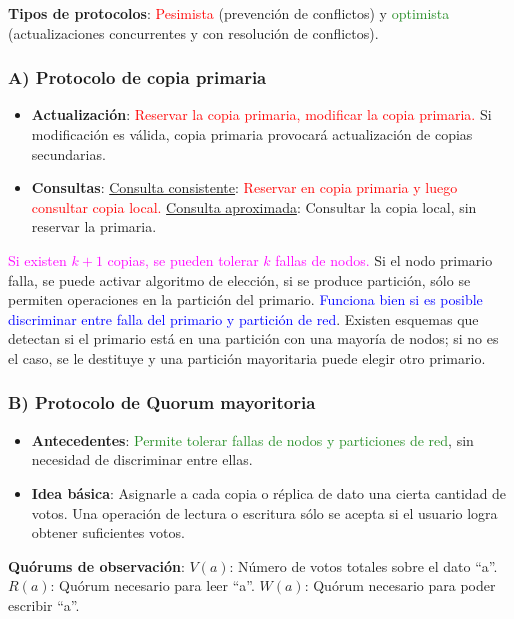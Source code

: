 \textbf{Tipos de protocolos}: \textcolor{red}{Pesimista} 
(prevención de conflictos) y \textcolor{ForestGreen}{optimista} (actualizaciones concurrentes y con resolución de conflictos).

\subsubsection{A) Protocolo de copia primaria}

\begin{itemize}
    \item \textbf{Actualización}: \textcolor{red}{Reservar la copia primaria, modificar la copia primaria.} Si modificación es válida, copia primaria provocará actualización de copias secundarias.
    \item \textbf{Consultas}: \underline{Consulta consistente}: \textcolor{red}{Reservar en copia primaria y luego consultar copia local.} \underline{Consulta aproximada}: Consultar la copia local, sin reservar la primaria.
\end{itemize}

\textcolor{Fuchsia}{Si existen $k+1$ copias, se pueden tolerar $k$ fallas de nodos.} Si el nodo primario falla, se puede activar algoritmo de elección, si se produce partición, sólo se permiten operaciones en la partición del primario. \textcolor{blue}{Funciona bien si es posible discriminar entre falla del primario y partición de red}. Existen esquemas que detectan si el primario está en una partición con una mayoría de nodos; si no es el caso, se le destituye y una partición mayoritaria puede elegir otro primario.

\subsubsection{B) Protocolo de Quorum mayoritoria}

\begin{itemize}
    \item \textbf{Antecedentes}: \textcolor{ForestGreen}{Permite tolerar fallas de nodos y particiones de red}, sin necesidad de discriminar entre ellas.
    \item \textbf{Idea básica}: \textcolor{Sepia}{Asignarle a cada copia o réplica de dato una cierta cantidad de votos}. Una operación de lectura o escritura sólo se acepta si el usuario logra obtener suficientes votos.
\end{itemize}

\textbf{Quórums de observación}: $V(a)$: Número de votos totales sobre el dato \enquote{a}. $R(a)$: Quórum necesario para leer \enquote{a}. $W(a)$: Quórum necesario para poder escribir \enquote{a}.

